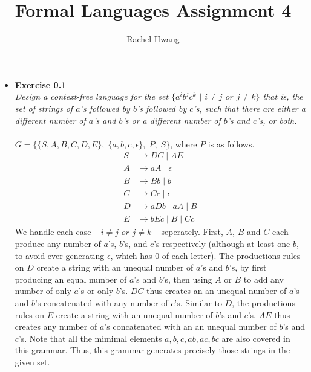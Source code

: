 \documentclass[12pt]{article}
\title{Formal Languages Assignment 4}
\author{Rachel Hwang}
\begin{document}
\maketitle

\begin{itemize}
\item{\textbf{Exercise 0.1}} \\
\emph{Design a context-free language for the set $\{a^ib^jc^k$ $|$ $i \neq j$ $or$ $j \neq k\}$ that is, the set of strings of $a$'s followed by $b$'s followed by $c$'s, such that there are either a different number of $a$'s and $b$'s or a different number of $b$'s and $c$'s, or both.} \\
\\
$G = \{\{S,A,B,C,D,E\},\; \{a,b,c,\epsilon\},\; P,\; S\}$, where $P$ is as follows. 
\begin{align}
\nonumber S &\rightarrow DC\;|\;AE \\
\nonumber A &\rightarrow aA\;|\;\epsilon \\
\nonumber B &\rightarrow Bb\;|\;b \\
\nonumber C &\rightarrow Cc\;|\;\epsilon \\
\nonumber D &\rightarrow aDb\;|\;aA\;|\;B \\
\nonumber E &\rightarrow bEc\;|\;B\;|\;Cc
\end{align}
We handle each case -- $i \neq j$ $or$ $j \neq k$ -- seperately. First, $A$, $B$ and $C$ each produce any number of $a$'s, $b$'s, and $c$'s respectively (although at least one $b$, to avoid ever generating $\epsilon$, which has 0 of each letter). The productions rules on $D$ create a string with an unequal number of $a$'s and $b$'s, by first producing an equal number of $a$'s and $b$'s, then using $A$ or $B$ to add any number of only $a$'s or only $b$'s. $DC$ thus creates an an unequal number of $a$'s and $b$'s concatenated with any number of $c$'s. Similar to $D$, the productions rules on $E$ create a string with an unequal number of $b$'s and $c$'s. $AE$ thus creates any number of $a$'s concatenated with an an unequal number of $b$'s and $c$'s. Note that all the mimimal elements $a, b, c, ab, ac, bc$ are also covered in this grammar. Thus, this grammar generates precisely those strings in the given set. \\
\\


\end{itemize}
\end{document}
